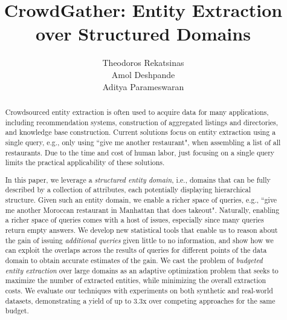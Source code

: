 \documentclass{vldb}
\begin{document}

\title{CrowdGather: Entity Extraction over Structured Domains}


\author{
	\alignauthor Theodoros Rekatsinas\\
            \alignauthor Amol Deshpande\\
            \alignauthor Aditya Parameswaran \\
}

\maketitle

\begin{abstract}
Crowdsourced entity extraction is often used to acquire data for many applications, including recommendation systems, 
construction of aggregated listings and directories, and knowledge base construction. Current solutions focus on entity extraction using a single query, e.g., only using ``give me another restaurant", when assembling a list of all restaurants. Due to the time and cost of human labor, just focusing on a single query limits the practical applicability of these solutions.

In this paper, we leverage a {\em structured entity domain}, i.e., domains that can be fully described by a collection of attributes, each potentially displaying hierarchical structure. Given such an entity domain, we enable a richer space of queries, e.g., ``give me another Moroccan restaurant in Manhattan that does takeout". Naturally, enabling a richer space of queries comes with a host of issues, especially since many queries return empty answers. We develop new statistical tools that enable us to reason about the gain of issuing {\em additional queries} given little to no information, and show how we can exploit the overlaps across the results of queries for different points of the data
domain to obtain accurate estimates of the gain. We cast the problem of {\em budgeted entity extraction} over large domains as an adaptive optimization problem that seeks to maximize the number of extracted entities, while minimizing the overall extraction costs. We evaluate our techniques with experiments on both synthetic and real-world datasets, demonstrating a yield of up to 3.3x over competing approaches for the same budget.
\end{abstract}








\balance

{\small


}
\end{document}
